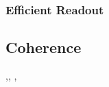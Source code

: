 \subsubsection{Efficient Readout}

\cite{Eisenach2021}

\cite{Anderson2022-sf}


\cite{Niethammer2019}


\cite{Morello2010}

\cite{PhysRevApplied.17.034046}


\subsection{Coherence}
\cite{Christle2014},\cite{Soltamov2019}, \cite{Gilardoni2020} \cite{BulanceaLindvall2021}, \cite{Astner2022}

\cite{Seo2016-ed}

